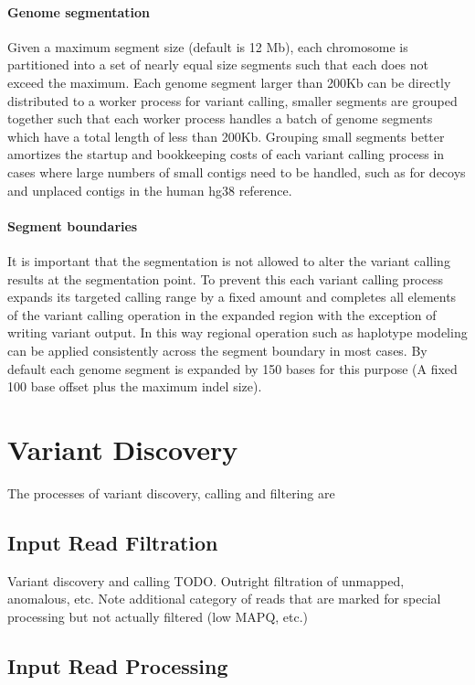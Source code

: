 \documentclass{article}
\begin{document}
\paragraph{Genome segmentation} Given a maximum segment size (default is 12 Mb), each chromosome is partitioned into a set of nearly equal size segments such that each does not exceed the maximum. Each genome segment larger than 200Kb can be directly distributed to a worker process for variant calling, smaller segments are grouped together such that each worker process handles a batch of genome segments which have a total length of less than 200Kb. Grouping small segments better amortizes the startup and bookkeeping costs of each variant calling process in cases where large numbers of small contigs need to be handled, such as for decoys and unplaced contigs in the human hg38 reference.

\paragraph{Segment boundaries} It is important that the segmentation is not allowed to alter the variant calling results at the segmentation point. To prevent this each variant calling process expands its targeted calling range by a fixed amount and completes all elements of the variant calling operation in the expanded region with the exception of writing variant output. In this way regional operation such as haplotype modeling can be applied consistently across the segment boundary in most cases. By default each genome segment is expanded by 150 bases for this purpose (A fixed 100 base offset plus the maximum indel size).

\section{Variant Discovery}

The processes of variant discovery, calling and filtering are

\subsection{Input Read Filtration}

Variant discovery and calling
TODO. Outright filtration of unmapped, anomalous, etc. Note additional category of reads that are marked for special processing but not actually filtered (low MAPQ, etc.)


\subsection{Input Read Processing}
\end{document}
